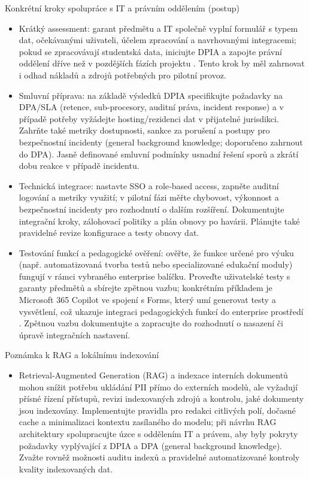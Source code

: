 \documentclass{report}%
\begin{document}
Konkrétní kroky spolupráce s IT a právním oddělením (postup)
\begin{itemize}
\item Krátký assessment: garant předmětu a IT společně vyplní formulář s typem dat, očekávanými uživateli, účelem zpracování a navrhovanými integracemi; pokud se zpracovávají studentská data, iniciujte DPIA a zapojte právní oddělení dříve než v pozdějších fázích projektu \cite{kb_malinka_chatgpt_ve_vyuce_dva_roky_pote_2024_pdf_90bc3aaf_page_12_1}. Tento krok by měl zahrnovat i odhad nákladů a zdrojů potřebných pro pilotní provoz.
\item Smluvní příprava: na základě výsledků DPIA specifikujte požadavky na DPA/SLA (retence, sub‑procesory, auditní práva, incident response) a v případě potřeby vyžádejte hosting/rezidenci dat v přijatelné jurisdikci. Zahrňte také metriky dostupnosti, sankce za porušení a postupy pro bezpečnostní incidenty (general background knowledge; doporučeno zahrnout do DPA). Jasně definované smluvní podmínky usnadní řešení sporů a zkrátí dobu reakce v případě incidentu.
\item Technická integrace: nastavte SSO a role‑based access, zapněte auditní logování a metriky využití; v pilotní fázi měřte chybovost, výkonnost a bezpečnostní incidenty pro rozhodnutí o dalším rozšíření. Dokumentujte integrační kroky, zálohovací politiky a plán obnovy po havárii. Plánujte také pravidelné revize konfigurace a testy obnovy dat.
\item Testování funkcí a pedagogické ověření: ověřte, že funkce určené pro výuku (např. automatizovaná tvorba testů nebo specializované edukační moduly) fungují v rámci vybraného enterprise balíčku. Proveďte uživatelské testy s garanty předmětů a sbírejte zpětnou vazbu; konkrétním příkladem je Microsoft 365 Copilot ve spojení s Forms, který umí generovat testy a vysvětlení, což ukazuje integraci pedagogických funkcí do enterprise prostředí \cite{kb_ai_101_tipu_pdf_04e4a115_page_36_1}. Zpětnou vazbu dokumentujte a zapracujte do rozhodnutí o nasazení či úpravě integračních nastavení.
\end{itemize}

Poznámka k RAG a lokálnímu indexování
\begin{itemize}
\item Retrieval‑Augmented Generation (RAG) a indexace interních dokumentů mohou snížit potřebu ukládání PII přímo do externích modelů, ale vyžadují přísné řízení přístupů, revizi indexovaných zdrojů a kontrolu, jaké dokumenty jsou indexovány. Implementujte pravidla pro redakci citlivých polí, dočasné cache a minimalizaci kontextu zasílaného do modelu; při návrhu RAG architektury spolupracujte úzce s oddělením IT a právem, aby byly pokryty požadavky vyplývající z DPIA a DPA (general background knowledge). Zvažte rovněž možnosti auditu indexů a pravidelné automatizované kontroly kvality indexovaných dat.
\end{itemize}
\end{document}
